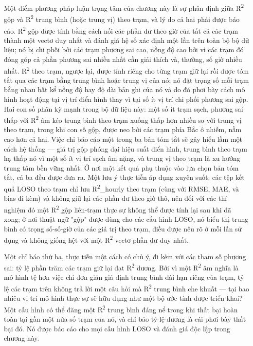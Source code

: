 Một điểm phương pháp luận trọng tâm của chương này là sự phân định giữa R\textsuperscript{2} gộp và R\textsuperscript{2} trung bình (hoặc trung vị) theo trạm, và lý do cả hai phải được báo cáo. R\textsuperscript{2} gộp được tính bằng cách nối các phần dư theo giờ của tất cả các trạm thành một vectơ duy nhất và đánh giá hệ số xác định một lần trên toàn bộ bộ dữ liệu; nó bị chi phối bởi các trạm phương sai cao, nồng độ cao bởi vì các trạm đó đóng góp cả phần phương sai nhiều nhất cần giải thích và, thường, số giờ nhiều nhất. R\textsuperscript{2} theo trạm, ngược lại, được tính riêng cho từng trạm giữ lại rồi được tóm tắt qua các trạm bằng trung bình hoặc trung vị của nó; nó đặt trọng số mỗi trạm bằng nhau bất kể nồng độ hay độ dài bản ghi của nó và do đó phơi bày cách mô hình hoạt động tại vị trí điển hình thay vì tại số ít vị trí chi phối phương sai gộp. Hai con số phân kỳ mạnh trong bộ dữ liệu này: một số ít trạm sạch, phương sai thấp với R\textsuperscript{2} âm kéo trung bình theo trạm xuống thấp hơn nhiều so với trung vị theo trạm, trong khi con số gộp, được neo bởi các trạm phía Bắc ô nhiễm, nằm cao hơn cả hai. Việc chỉ báo cáo một trong ba bản tóm tắt sẽ gây hiểu lầm một cách hệ thống --- giá trị gộp phóng đại hiệu suất điển hình, trung bình theo trạm hạ thấp nó vì một số ít vị trí sạch âm nặng, và trung vị theo trạm là xu hướng trung tâm bền vững nhất. Ở nơi một kết quả phụ thuộc vào lựa chọn bản tóm tắt, cả ba đều được đưa ra. Một lưu ý thực tiễn áp dụng xuyên suốt: các tệp kết quả LOSO theo trạm chỉ lưu R\textsuperscript{2}\_hourly theo trạm (cùng với RMSE, MAE, và bias đi kèm) và không giữ lại các phần dư theo giờ thô, nên đối với các thí nghiệm đó một R\textsuperscript{2} gộp liên-trạm thực sự không thể được tính lại sau khi đã xong; ở nơi thuật ngữ "gộp" được dùng cho các cấu hình LOSO, nó biểu thị trung bình có trọng số-số-giờ của các giá trị theo trạm, điều được nêu rõ ở mỗi lần sử dụng và không giống hệt với một R\textsuperscript{2} vectơ-phần-dư duy nhất.

Một chỉ báo thứ ba, thực tiễn một cách có chủ ý, đi kèm với các tham số phương sai: tỷ lệ phần trăm các trạm giữ lại đạt R\textsuperscript{2} dương. Bởi vì một R\textsuperscript{2} âm nghĩa là mô hình tệ hơn việc chỉ đơn giản giả định trung bình dài hạn riêng của trạm, tỷ lệ các trạm trên không trả lời một câu hỏi mà R\textsuperscript{2} trung bình che khuất --- tại bao nhiêu vị trí mô hình thực sự sẽ hữu dụng như một bộ ước tính được triển khai? Một cấu hình có thể đăng một R\textsuperscript{2} trung bình đáng nể trong khi thất bại hoàn toàn tại gần một nửa số trạm của nó, và chỉ báo tỷ-lệ-dương là cái phơi bày thất bại đó. Nó được báo cáo cho mọi cấu hình LOSO và đánh giá độc lập trong chương này.


